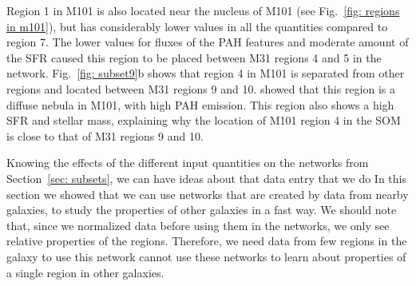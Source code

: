     Region 1 in M101 is also located near the nucleus of M101 (see Fig.~\ref{fig: regions in m101}), but has considerably lower values in all the quantities compared to region 7.
    The lower values for fluxes of the PAH features and moderate amount of the SFR caused this region to be placed between M31 regions 4 and 5 in the network. 
    Fig.~\ref{fig: subset9}b shows that region 4 in M101 is separated from other regions and located between M31 regions 9 and 10.
    \cite{Gordon08} showed that this region is a diffuse nebula in M101, with high PAH emission. 
    This region also shows a high SFR and stellar mass, explaining why the location of M101 region 4 in the SOM is close to that of M31 regions 9 and 10.
    
    Knowing the effects of the different input quantities on the networks from Section~\ref{sec: subsets}, we can have ideas about that data entry that we do
    In this section we showed that we can use networks that are created by data from nearby galaxies, to study the properties of other galaxies in a fast way.
    We should note that, since we normalized data before using them in the networks, we only see relative properties of the regions.
    Therefore, we need data from few regions in the galaxy to use this network cannot use these networks to learn about properties of a single region in other galaxies.
    
    